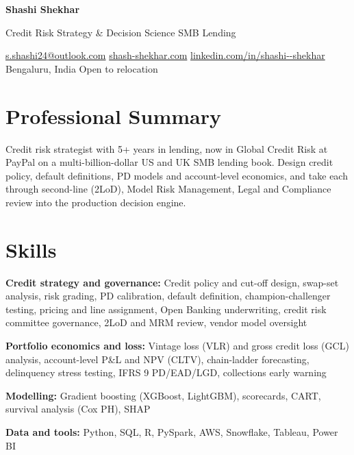 \documentclass[10pt,a4paper]{article}
\begin{document}
{\LARGE\bfseries Shashi Shekhar}\par\vspace{2pt}
{\large Credit Risk Strategy \& Decision Science \textbar{} SMB Lending}\par\vspace{3pt}
{\small \href{mailto:s.shashi24@outlook.com}{s.shashi24@outlook.com} \textbar{} \href{https://www.shash-shekhar.com}{shash-shekhar.com} \textbar{} \href{https://www.linkedin.com/in/shashi--shekhar}{linkedin.com/in/shashi-{}-shekhar} \textbar{} Bengaluru, India \textbar{} Open to relocation}\par
\section{Professional Summary}
Credit risk strategist with 5+ years in lending, now in Global Credit Risk at PayPal on a multi-billion-dollar US and UK SMB lending book. Design credit policy, default definitions, PD models and account-level economics, and take each through second-line (2LoD), Model Risk Management, Legal and Compliance review into the production decision engine.\par
\section{Skills}
\textbf{Credit strategy and governance:} Credit policy and cut-off design, swap-set analysis, risk grading, PD calibration, default definition, champion-challenger testing, pricing and line assignment, Open Banking underwriting, credit risk committee governance, 2LoD and MRM review, vendor model oversight\par\vspace{1pt}
\textbf{Portfolio economics and loss:} Vintage loss (VLR) and gross credit loss (GCL) analysis, account-level P\&L and NPV (CLTV), chain-ladder forecasting, delinquency stress testing, IFRS 9 PD/EAD/LGD, collections early warning\par\vspace{1pt}
\textbf{Modelling:} Gradient boosting (XGBoost, LightGBM), scorecards, CART, survival analysis (Cox PH), SHAP\par\vspace{1pt}
\textbf{Data and tools:} Python, SQL, R, PySpark, AWS, Snowflake, Tableau, Power BI\par\vspace{1pt}
\end{document}
